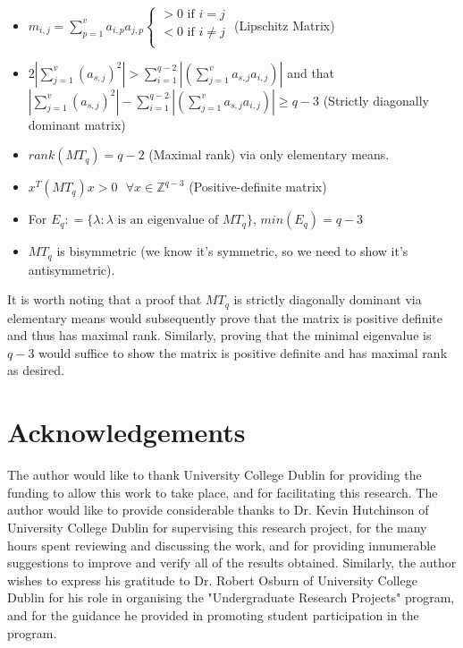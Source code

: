 \documentclass[11pt]{article}
\theoremstyle{plain}
\theoremstyle{definition}
\begin{document}
\begin{itemize}
	\item $
	m_{i,j} = \sum\limits_{p=1}^{v} a_{i,p} a_{j, p} 
	\begin{cases}
	> 0\text{ if }i = j \\
	< 0\text{ if }i \neq j\\
	\end{cases}
	$ (Lipschitz Matrix)
	\item $2 | \sum\limits_{j=1}^{v} ( a_{s,j} )^2 | > \sum\limits_{i=1}^{q-2} | ( \sum\limits_{j=1}^{v} a_{s,j} a_{i,j} ) |$ and that $ | \sum\limits_{j=1}^{v} ( a_{s,j} )^2 | - \sum\limits_{i=1}^{q-2} | ( \sum\limits_{j=1}^{v} a_{s,j} a_{i,j} ) | \geq q-3$ (Strictly diagonally dominant matrix)
	\item $ rank(MT_q) = q-2 $ (Maximal rank) via only elementary means.
	\item $ x^T (MT_q) x > 0 \text{ } \forall x \in \mathbb{Z}^{q-3}$ (Positive-definite matrix)
	\item For $E_q : = \{\lambda : \lambda \text{ is an eigenvalue of }MT_q \}$, $min(E_q) = q-3$
	\item $MT_q$ is bisymmetric (we know it's symmetric, so we need to show it's antisymmetric).
\end{itemize}
It is worth noting that a proof that $MT_q$ is strictly diagonally dominant via elementary means would subsequently prove that the matrix is positive definite and thus has maximal rank. Similarly, proving that the minimal eigenvalue is $q-3$ would suffice to show the matrix is positive definite and has maximal rank as desired.

\pagebreak
\section{Acknowledgements}\label{section:Acknowledgements}
The author would like to thank University College Dublin for providing the funding to allow this work to take place, and for facilitating this research. The author would like to provide considerable thanks to Dr. Kevin Hutchinson of University College Dublin for supervising this research project, for the many hours spent reviewing and discussing the work, and for providing innumerable suggestions to improve and verify all of the results obtained. Similarly, the author wishes to express his gratitude to Dr. Robert Osburn of University College Dublin for his role in organising the "Undergraduate Research Projects" program, and for the guidance he provided in promoting student participation in the program.
\end{document}
